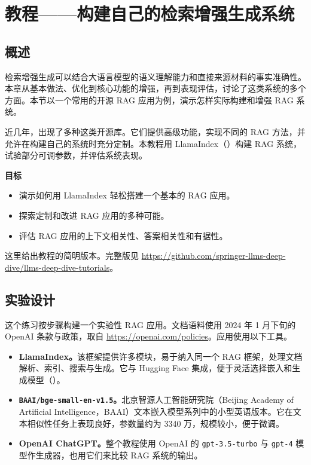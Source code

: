 \section{教程——构建自己的检索增强生成系统}
\label{sec:ch07-tutorial}
\subsection{概述}
检索增强生成可以结合大语言模型的语义理解能力和直接来源材料的事实准确性。本章从基本做法、优化到核心功能的增强，再到表现评估，讨论了这类系统的多个方面。本节以一个常用的开源 RAG 应用为例，演示怎样实际构建和增强 RAG 系统。

近几年，出现了多种这类开源库。它们提供高级功能，实现不同的 RAG 方法，并允许在构建自己的系统时充分定制。本教程用 LlamaIndex（）构建 RAG 系统，试验部分可调参数，并评估系统表现。

\begin{keypoint}
\noindent\textbf{目标}
\begin{itemize}
\item 演示如何用 LlamaIndex 轻松搭建一个基本的 RAG 应用。
\item 探索定制和改进 RAG 应用的多种可能。
\item 评估 RAG 应用的上下文相关性、答案相关性和有据性。
\end{itemize}
\end{keypoint}

这里给出教程的简明版本。完整版见 \url{https://github.com/springer-llms-deep-dive/llms-deep-dive-tutorials}。

\subsection{实验设计}
这个练习按步骤构建一个实验性 RAG 应用。文档语料使用 2024 年 1 月下旬的 OpenAI 条款与政策，取自 \url{https://openai.com/policies}。应用使用以下工具。

\begin{itemize}
\item \textbf{LlamaIndex。}该框架提供许多模块，易于纳入同一个 RAG 框架，处理文档解析、索引、搜索与生成。它与 Hugging Face 集成，便于灵活选择嵌入和生成模型（）。
\item \textbf{\texttt{BAAI/bge-small-en-v1.5}。}北京智源人工智能研究院（Beijing Academy of Artificial Intelligence，BAAI）文本嵌入模型系列中的小型英语版本。它在文本相似性任务上表现良好，参数量约为 3340 万，规模较小，便于微调。
\item \textbf{OpenAI ChatGPT。}整个教程使用 OpenAI 的 \texttt{gpt-3.5-turbo} 与 \texttt{gpt-4} 模型作生成器，也用它们来比较 RAG 系统的输出。
\end{itemize}

